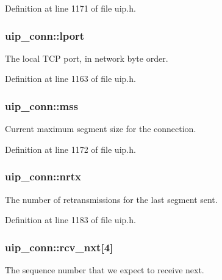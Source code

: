 Definition at line 1171 of file uip.h.

\hypertarget{structuip__conn_a0cd09beee671e7e9efb0b4aced10249e}{
\subsubsection[{lport}]{ {\bf uip\_\-conn::lport}}}
\label{structuip__conn_a0cd09beee671e7e9efb0b4aced10249e}
The local TCP port, in network byte order. 

Definition at line 1163 of file uip.h.

\hypertarget{structuip__conn_a3347ef1b6e8581402445d1a0280c7a14}{
\subsubsection[{mss}]{ {\bf uip\_\-conn::mss}}}
\label{structuip__conn_a3347ef1b6e8581402445d1a0280c7a14}
Current maximum segment size for the connection. 

Definition at line 1172 of file uip.h.

\hypertarget{structuip__conn_a4289c59840b128f2f6526e9da2711d47}{
\subsubsection[{nrtx}]{ {\bf uip\_\-conn::nrtx}}}
\label{structuip__conn_a4289c59840b128f2f6526e9da2711d47}
The number of retransmissions for the last segment sent. 

Definition at line 1183 of file uip.h.

\hypertarget{structuip__conn_a70297b3e6d4eaae7bd828cb50bd1efe3}{
\subsubsection[{rcv\_\-nxt}]{ {\bf uip\_\-conn::rcv\_\-nxt}\mbox{[}4\mbox{]}}}
\label{structuip__conn_a70297b3e6d4eaae7bd828cb50bd1efe3}
The sequence number that we expect to receive next. 


